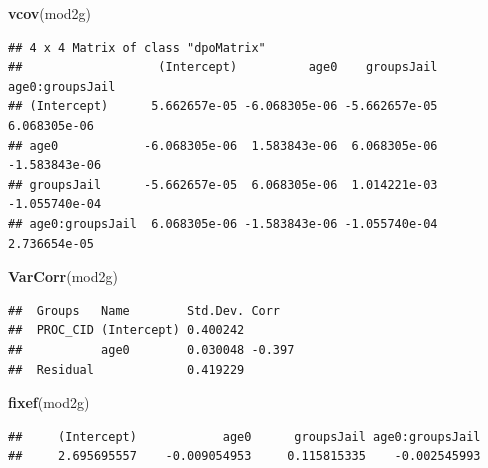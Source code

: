 \documentclass[ignorenonframetext,]{beamer}
\newenvironment{Shaded}{\begin{snugshade}}{\end{snugshade}}
\newcommand{\KeywordTok}[1]{\textcolor[rgb]{0.13,0.29,0.53}{\textbf{{#1}}}}
\newcommand{\NormalTok}[1]{{#1}}
\begin{document}
\begin{frame}[fragile]

\small

\begin{Shaded}
\begin{Highlighting}[]
\KeywordTok{vcov}\NormalTok{(mod2g)}
\end{Highlighting}
\end{Shaded}

\begin{verbatim}
## 4 x 4 Matrix of class "dpoMatrix"
##                   (Intercept)          age0    groupsJail age0:groupsJail
## (Intercept)      5.662657e-05 -6.068305e-06 -5.662657e-05    6.068305e-06
## age0            -6.068305e-06  1.583843e-06  6.068305e-06   -1.583843e-06
## groupsJail      -5.662657e-05  6.068305e-06  1.014221e-03   -1.055740e-04
## age0:groupsJail  6.068305e-06 -1.583843e-06 -1.055740e-04    2.736654e-05
\end{verbatim}

\end{frame}

\begin{frame}[fragile]

\small

\begin{Shaded}
\begin{Highlighting}[]
\KeywordTok{VarCorr}\NormalTok{(mod2g)}
\end{Highlighting}
\end{Shaded}

\begin{verbatim}
##  Groups   Name        Std.Dev. Corr  
##  PROC_CID (Intercept) 0.400242       
##           age0        0.030048 -0.397
##  Residual             0.419229
\end{verbatim}

\end{frame}

\begin{frame}[fragile]

\small

\begin{Shaded}
\begin{Highlighting}[]
\KeywordTok{fixef}\NormalTok{(mod2g)}
\end{Highlighting}
\end{Shaded}

\begin{verbatim}
##     (Intercept)            age0      groupsJail age0:groupsJail 
##     2.695695557    -0.009054953     0.115815335    -0.002545993
\end{verbatim}

\end{frame}
\end{document}
